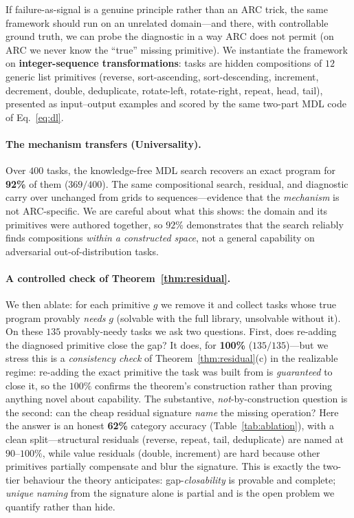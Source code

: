 If failure-as-signal is a genuine principle rather than an ARC trick, the same framework should run on an
unrelated domain---and there, with controllable ground truth, we can probe the diagnostic in a way ARC does
not permit (on ARC we never know the ``true'' missing primitive). We instantiate the framework on
\textbf{integer-sequence transformations}: tasks are hidden compositions of $12$ generic list primitives
(reverse, sort-ascending, sort-descending, increment, decrement, double, deduplicate, rotate-left,
rotate-right, repeat, head, tail), presented as input--output examples and scored by the same two-part MDL
code of Eq.~\eqref{eq:dl}.

\paragraph{The mechanism transfers (Universality).} Over $400$ tasks, the knowledge-free MDL search recovers
an exact program for \textbf{92\%} of them ($369/400$). The same compositional search, residual, and
diagnostic carry over unchanged from grids to sequences---evidence that the \emph{mechanism} is not
ARC-specific. We are careful about what this shows: the domain and its primitives were authored together, so
$92\%$ demonstrates that the search reliably finds compositions \emph{within a constructed space}, not a
general capability on adversarial out-of-distribution tasks.

\paragraph{A controlled check of Theorem~\ref{thm:residual}.} We then ablate: for each primitive $g$ we remove
it and collect tasks whose true program provably \emph{needs} $g$ (solvable with the full library, unsolvable
without it). On these $135$ provably-needy tasks we ask two questions. First, does re-adding the diagnosed
primitive close the gap? It does, for \textbf{100\%} ($135/135$)---but we stress this is a
\emph{consistency check} of Theorem~\ref{thm:residual}(c) in the realizable regime: re-adding the exact
primitive the task was built from is \emph{guaranteed} to close it, so the $100\%$ confirms the theorem's
construction rather than proving anything novel about capability. The substantive, \emph{not}-by-construction
question is the second: can the cheap residual signature \emph{name} the missing operation? Here the answer is
an honest \textbf{62\%} category accuracy (Table~\ref{tab:ablation}), with a clean split---structural residuals
(reverse, repeat, tail, deduplicate) are named at $90$--$100\%$, while value residuals (double, increment) are
hard because other primitives partially compensate and blur the signature. This is exactly the two-tier
behaviour the theory anticipates: gap-\emph{closability} is provable and complete; \emph{unique naming} from
the signature alone is partial and is the open problem we quantify rather than hide.

